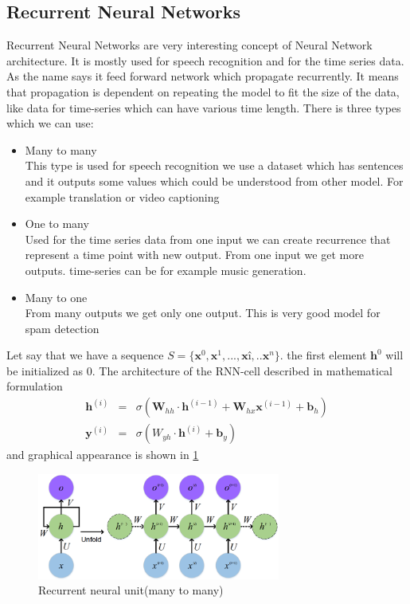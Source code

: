 \subsection{Recurrent Neural Networks}
Recurrent Neural Networks are very interesting concept of Neural Network architecture. It is mostly used for speech recognition and for the time series data\cite{mlprnn}.\\
As the name says it feed forward network which propagate recurrently. It means that propagation is dependent on repeating the model to fit the size of the data, like data for time-series which can have various time length. 
There is three types which we can use\cite{rnntypes}:
\begin{itemize}
	\item Many to many\\
	This type is used for speech recognition we use a dataset which has sentences and it outputs some values which could be understood from other model. For example translation or video captioning
	\item One to many\\
	Used for the time series data from one input we can create recurrence that represent a time point with new output. From one input we get more outputs. time-series can be for example music generation.
	\item Many to one\\
	From many outputs we get only one output. This is very good model for spam detection
\end{itemize}
Let say that we have a sequence $S = \{\mathbf{x}^0,\mathbf{x}^1,...,\mathbf{x}î,..\mathbf{x}^n\}$. the first element $\mathbf{h}^0$ will be initialized as 0.
The architecture of the RNN-cell\cite{rnn} described in mathematical formulation 
\begin{eqnarray*}
	\mathbf{h}^{(i)} &=& \sigma(\mathbf{W}_{hh} \cdot \mathbf{h}^{(i-1)} + \mathbf{W}_{hx}\mathbf{x}^{(i-1)} + \mathbf{b}_h)\\
	\mathbf{y}^{(i)} &=& \sigma(W_{yh}\cdot \mathbf{h}^{(i)} + \mathbf{b}_y)
\end{eqnarray*} and graphical appearance is shown in \ref{rnn}
\begin{figure}[h!]
	\centering\includegraphics[width=8cm]{chapters/chapter2/rnn}
	\caption{Recurrent neural unit(many to many)\cite{rnn_picture}}
	\label{rnn}
\end{figure}

